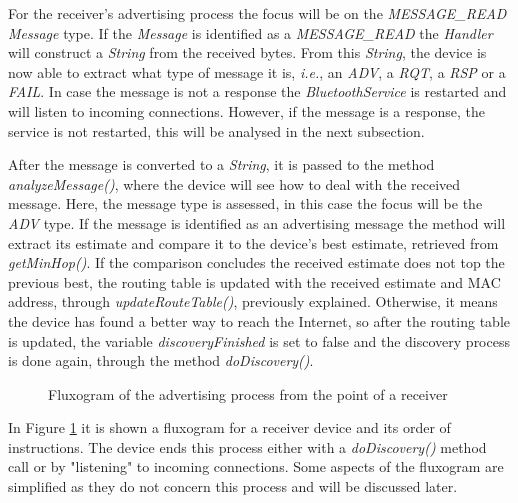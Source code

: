 For the receiver's advertising process the focus will be on the \textit{MESSAGE\_READ} \textit{Message} type. If the \textit{Message} is identified as a \textit{MESSAGE\_READ} the \textit{Handler} will construct a \textit{String} from the received bytes. From this \textit{String}, the device is now able to extract what type of message it is, \textit{i.e.}, an \textit{ADV}, a \textit{RQT}, a \textit{RSP} or a \textit{FAIL}. In case the message is not a response the \textit{BluetoothService} is restarted and will listen to incoming connections. However, if the message is a response, the service is not restarted, this will be analysed in the next subsection.

After the message is converted to a \textit{String}, it is passed to the method \textit{analyzeMessage()}, where the device will see how to deal with the received message. Here, the message type is assessed, in this case the focus will be the \textit{ADV} type. If the message is identified as an advertising message the method will extract its estimate and compare it to the device's best estimate, retrieved from \textit{getMinHop()}. If the comparison concludes the received estimate does not top the previous best, the routing table is updated with the received estimate and \gls{MAC} address, through \textit{updateRouteTable()}, previously explained. Otherwise, it means the device has found a better way to reach the Internet, so after the routing table is updated, the variable \textit{discoveryFinished} is set to false and the discovery process is done again, through the method \textit{doDiscovery()}.

\begin{figure}[ht]
   \noindent{}
	\caption{\label{fig:recvadvflux} Fluxogram of the advertising process from the point of a receiver}
\end{figure}

In Figure \ref{fig:recvadvflux} it is shown a fluxogram for a receiver device and its order of instructions. The device ends this process either with a \textit{doDiscovery()} method call or by "listening" to incoming connections. Some aspects of the fluxogram are simplified as they do not concern this process and will be discussed later.

